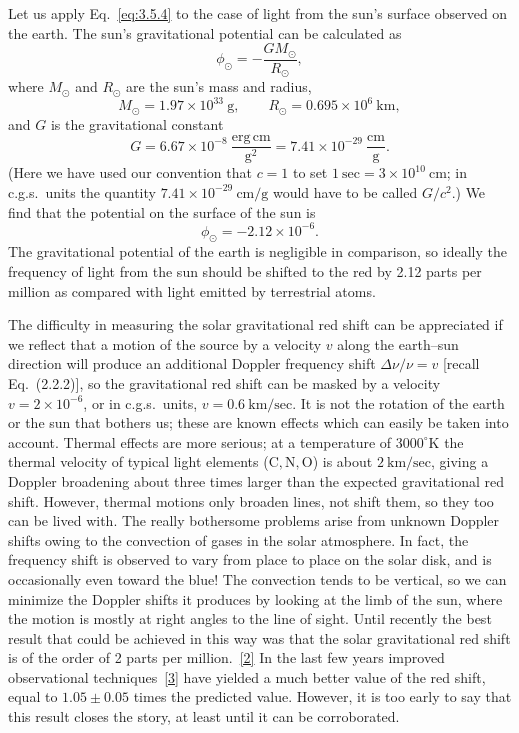 Let us apply Eq.~\eqref{eq:3.5.4} to the case of light from the sun's surface
observed on the earth. The sun's gravitational potential can be calculated
as
\[
  \phi_\odot=-\frac{GM_\odot}{R_\odot},
\]
where $M_\odot$ and $R_\odot$ are the sun's mass and radius,
\[
  M_\odot=1.97\times10^{33}\ \mathrm{g},
  \qquad
  R_\odot=0.695\times10^6\ \mathrm{km},
\]
and $G$ is the gravitational constant
\begin{equation}
  G=6.67\times10^{-8}\ \frac{\mathrm{erg\,cm}}{\mathrm{g}^2}
  =7.41\times10^{-29}\ \frac{\mathrm{cm}}{\mathrm{g}}.
  \tag{3.5.5}\label{eq:3.5.5}
\end{equation}
(Here we have used our convention that $c=1$ to set
$1\ \mathrm{sec}=3\times10^{10}\ \mathrm{cm}$; in c.g.s.\ units the
quantity $7.41\times10^{-29}\ \mathrm{cm/g}$ would have to be called
$G/c^2$.) We find that the potential on the surface of the sun is
\[
  \phi_\odot=-2.12\times10^{-6}.
\]
The gravitational potential of the earth is negligible in comparison, so
ideally the frequency of light from the sun should be shifted to the red by
2.12 parts per million as compared with light emitted by terrestrial atoms.

The difficulty in measuring the solar gravitational red shift can be
appreciated if we reflect that a motion of the source by a velocity $v$ along
the earth--sun direction will produce an additional Doppler frequency shift
$\Delta\nu/\nu=v$ [recall Eq.~(2.2.2)], so the gravitational red shift can
be masked by a velocity $v=2\times10^{-6}$, or in c.g.s.\ units,
$v=0.6\ \mathrm{km/sec}$. It is not the rotation of the earth or the sun
that bothers us; these are known effects which can easily be taken into
account. Thermal effects are more serious; at a temperature of
$3000^\circ\mathrm K$ the thermal velocity of typical light elements
($\mathrm C,\mathrm N,\mathrm O$) is about $2\ \mathrm{km/sec}$, giving a
Doppler broadening about three times larger than the expected gravitational
red shift. However, thermal motions only broaden lines, not shift them, so
they too can be lived with. The really bothersome problems arise from unknown
Doppler shifts owing to the convection of gases in the solar atmosphere. In
fact, the frequency shift is observed to vary from place to place on the
solar disk, and is occasionally even toward the blue! The convection tends
to be vertical, so we can minimize the Doppler shifts it produces by looking
at the limb of the sun, where the motion is mostly at right angles to the
line of sight. Until recently the best result that could be achieved in this
way was that the solar gravitational red shift is of the order of 2 parts
per million.~\hyperref[ch3-ref-2]{[2]} In the last few years improved
observational techniques~\hyperref[ch3-ref-3]{[3]} have yielded a much
better value of the red shift, equal to $1.05\pm0.05$ times the predicted
value. However, it is too early to say that this result closes the story, at
least until it can be corroborated.

